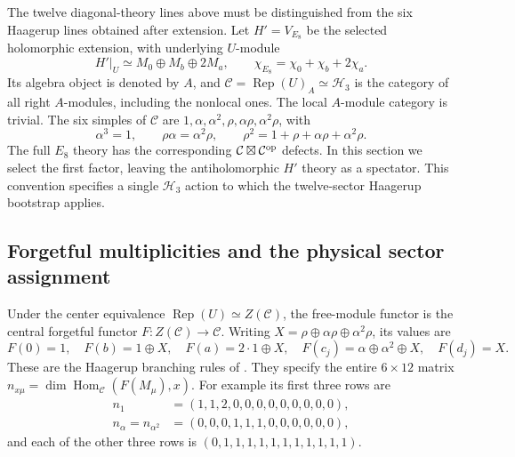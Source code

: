 \documentclass[11pt,a4paper]{article}
\theoremstyle{definition}
\begin{document}
The twelve diagonal-theory lines above must be distinguished from the
six Haagerup lines obtained after extension. Let
$H'=V_{E_8}$ be the selected holomorphic extension, with underlying
$U$-module
\begin{equation}
 H'\big|_U\simeq M_0\oplus M_b\oplus2M_a,
 \qquad \chi_{E_8}=\chi_0+\chi_b+2\chi_a.
 \label{eq:physics-E8-extension}
\end{equation}
Its algebra object is denoted by $A$, and
$\mathcal C=\operatorname{Rep}(U)_A\simeq\mathcal H_3$ is the
category of all right $A$-modules, including the nonlocal ones.
The local $A$-module category is trivial. The six simples of
$\mathcal C$ are $1,\alpha,\alpha^2,\rho,\alpha\rho,\alpha^2\rho$,
with
\begin{equation}
 \alpha^3=1,\qquad \rho\alpha=\alpha^2\rho,\qquad
 \rho^2=1+\rho+\alpha\rho+\alpha^2\rho.
 \label{eq:physics-H3-ring}
\end{equation}
The full $E_8$ theory has the corresponding
$\mathcal C\boxtimes\mathcal C^{\rm op}$ defects. In this section
we select the first factor, leaving the antiholomorphic $H'$ theory as
a spectator. This convention specifies a single $\mathcal H_3$ action
to which the twelve-sector Haagerup bootstrap applies.

\subsection{Forgetful multiplicities and the physical sector assignment}

Under the center equivalence
$\operatorname{Rep}(U)\simeq Z(\mathcal C)$, the free-module functor
is the central forgetful functor $F:Z(\mathcal C)\to\mathcal C$.
Writing $X=\rho\oplus\alpha\rho\oplus\alpha^2\rho$, its values are
\begin{equation}
 F(0)=1,\quad F(b)=1\oplus X,\quad F(a)=2\cdot1\oplus X,
 \quad F(c_j)=\alpha\oplus\alpha^2\oplus X,
 \quad F(d_j)=X.
 \label{eq:physics-forgetful}
\end{equation}
These are the Haagerup branching rules of
\cite[Eq.~(4.49)]{LOST}. They specify the entire $6\times12$ matrix
$n_{x\mu}=\dim\operatorname{Hom}_{\mathcal C}(F(M_\mu),x)$.
For example its first three rows are
\begin{align}
 n_1&=(1,1,2,0,0,0,0,0,0,0,0,0),\\
 n_\alpha=n_{\alpha^2}&=(0,0,0,1,1,1,0,0,0,0,0,0),
\end{align}
and each of the other three rows is
$(0,1,1,1,1,1,1,1,1,1,1,1)$.
\end{document}
